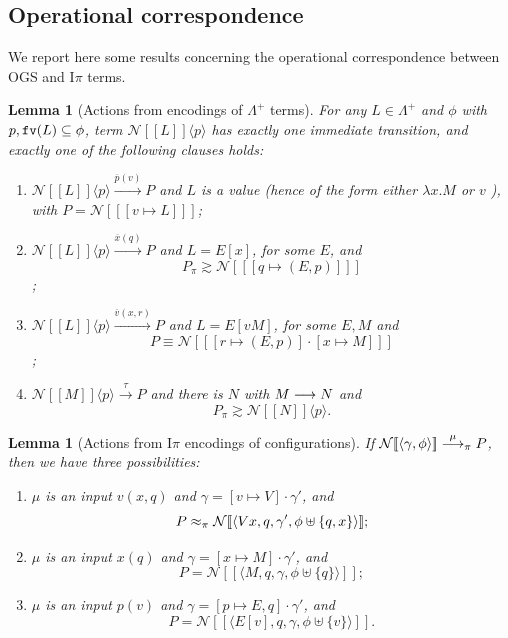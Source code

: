 \documentclass[11pt,a4paper]{amsart}
\theoremstyle{plain}
\theoremstyle{definition}
\theoremstyle{defC}
\theoremstyle{thmC}
\theoremstyle{plain}
\numberwithin{equation}{section}
\newif\ifcutCBNLMCS\cutCBNLMCSfalse
\newcommand{\wb}{\bsim}
\newcommand{\bsim}{\wbPI} %
\def\finish#1{\vskip.2cm\noindent{\em #1}%
  \marginpar{$\longleftarrow$}\vskip.2cm}
\newcommand{\finish}[1]{}
\newcommand{\pair}[2]{  #1 }      %
\newcommand{\pairP}[1]{  #1 }      %
\newcommand{\LL}{L} %
\def\fv#1{\mbox{\tt fv}(#1)}         %
\newcommand{\obj}[1]{\langle #1 \rangle}
\def\bout#1#2{\overline{#1}(#2)}   %
\def\app#1#2{#1\obj{#2}}                    %
\newcommand{\rmm}[1]{{\tt{\lowercase{#1}}}}
\newcommand{\genarr}[2]{\mathrel{\stackrel{{#1}}{\longrightarrow}_{\rmm{\lowercase{#2}}}}}
\newcommand{\arrPI}[1]{\genarr{#1}{\pi}}   %
\newcommand{\arr}[1]{\mathrel{\stackrel{{#1}}{\longrightarrow}}}  %
\newcommand{\genwb}[1]{\mathrel{\approx_{\rmm{\lowercase{#1}}}}}       %
\newcommand{\wbPI}{\genwb{\pi}}       %
\newcommand{\contr}{\mathrel{\mbox{}_{\pi}\!\!\gtrsim}}
\newcommand{\exn}{\contr} %
\newcommand{\encoN}[1]{{\mathcal {N}} [\! [ #1 ] \! ]  }
\newcommand{\encoSN}{\encoN}
\newcommand{\encoSPN}[2]{ \pairP{\app{ \encoSN{ #1}}{#2}}  }
\newcommand{\encPPN}[2]{ \pair{{\encoSN{ #1 }}}{#2}  }
\newcommand{\LaoP}{\Lambda^{+}}  %
\newcommand{\red}{\ensuremath\longrightarrow}
\newcommand{\Intp}{\mbox{I$\pi$}\xspace}   %
\newcommand{\piI}{\Intp}   %
\newcommand{\dsJ}[1]{\finish{{\bf DS(jun23):} #1}}
\newcommand{\dsJ}[1]{}
\newcommand{\pmap}[2]{[#1 \mapsto #2]}
\newcommand{\conf}[1]{\langle #1\rangle}
\theoremstyle{plain}
\newtheorem{lemma}[thm]{Lemma}
\theoremstyle{definition}
\begin{document}
\subsection{Operational correspondence}
\label{ss:oc_cbn}

We report here some results concerning the operational correspondence between 
OGS  and \piI terms. 


\begin{lemma}[Actions from encodings of 
$\LaoP$ terms]
\label{l:opt_op_cbn}
For any
  $\LL\in\LaoP$  and $\phi $ with 
 $p,\fv \LL \subseteq \phi$,  term  $\encoSPN L p$ has exactly
  one immediate transition, and exactly one of the following clauses holds:
\begin{enumerate}
\item $\encoSPN \LL p\arr{\bout pv} P $  
and $\LL$ is a value (hence of the form either  $ \lambda x. M $ or
$v$ ),  
 with $P =\encPPN { \pmap{v}{L}}{\phi \uplus \{v\}}$;

\item  
 $\encoSPN \LL p\arr{\bout x {q}}P$  
and $L =  
{E [x]}$, for some $E$, and 
$$P \contr  
  \encPPN { \pmap q{(E,p)}} {\phi \uplus \{q\}}
$$;

\item 
 $\encoSPN \LL p\arr{\bout v {x,r}}P$  
and $L =  
{E [v M]}$, for some $E,M$ 
and 
$$P \equiv 
  \encPPN { \pmap r{(E,p)}\cdot  \pmap x M } {\phi \uplus \{x,r\}}
$$;


\item 
$\encoSPN M p\arr\tau P$ and there is $N$  with $M\red N$ and
  $$P\exn \encoSPN  N p.$$ 
\end{enumerate}
\end{lemma}

\ifcutCBNLMCS 
\begin{proof}
\dsJ{I have checked (and thus rectified the def of $ \pmap q{(E,p)}$ in the encoding )} 
\end{proof}
\fi


\begin{lemma}[Actions from \piI encodings of  configurations]
\label{l:opt_con_cbn}
If  $\encoN{\conf {\gamma, \phi }} \arrPI \mu P$,
 then we have three possibilities:
\begin{enumerate}

\item $\mu $ is an input $v(x,q)$ and $\gamma 
= \pmap{v}{V}\cdot\gamma' $, and 
$$P \wb 
\encoN {
\conf{ V x,  q, \gamma', \phi \uplus \{ q,x\}}
} ;$$ 


\item $\mu $ is an input $x(q)$ and $\gamma 
= \pmap{x}{M}\cdot\gamma' $, and 
$$P  =
\encoN {
\conf{ M,  q, \gamma, \phi \uplus \{ q\}}
} ;$$ 


\item $\mu $ is an input $p(v)$ and $\gamma 
= \pmap{p}{E,q}\cdot\gamma' $, and 
$$P  = 
\encoN {
\conf{ E[v],  q, \gamma, \phi \uplus \{ v\}}
} .$$ 
\end{enumerate} 
\end{lemma} 
\end{document}
